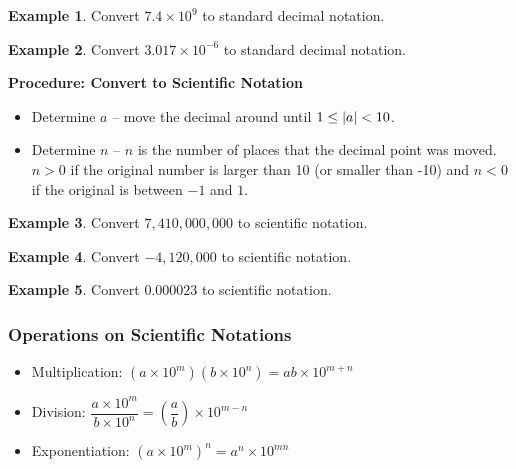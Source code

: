 \documentclass[addpoints,12pt]{exam}
\theoremstyle{definition}
\theoremstyle{break}
\theoremstyle{break}
\newtheorem{example}{Example}[subsection]
\begin{document}
\begin{example}
Convert $7.4 \times 10^9$ to standard decimal notation.
\vspace{.75in}
\end{example}

\begin{example}
Convert $3.017\times 10^{-6}$ to standard decimal notation.
\vspace{.5in}
\end{example}

\newpage
\begin{mdframed}
\textbf{Procedure: Convert to Scientific Notation}
\begin{itemize}
\item Determine $a$ -- move the decimal around until $1 \le \abs{a} < 10$.
\item Determine $n$ -- $n$ is the number of places that the decimal point was moved. $n > 0$ if the original number is larger than 10 (or smaller than -10) and $n < 0$ if the original is between $-1$ and $1$.
\end{itemize}
\end{mdframed}
\vspace{.15in}

\begin{example}
Convert $7,410,000,000$ to scientific notation.
\vspace{.75in}
\end{example}

\begin{example}
Convert $-4,120,000$ to scientific notation.
\vspace{.75in}
\end{example}

\begin{example}
Convert $0.000023$ to scientific notation.
\vspace{1in}
\end{example}

\subsubsection*{Operations on Scientific Notations}
\begin{itemize}
\item Multiplication: $(a\times 10^m)(b \times 10^n) = ab \times 10^{m+n}$
\vspace{.15in}
\item Division: $\dfrac{a \times 10^m}{b \times 10^n} = \left(\dfrac{a}{b}\right) \times 10^{m-n}$
\vspace{.15in}
\item Exponentiation: $(a\times 10^m)^n = a^n \times 10^{mn}$
\end{itemize}
\end{document}
